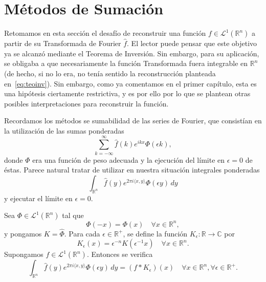 \noindent

\section{Métodos de Sumación}

Retomamos en esta sección el desafío de reconstruir una función $f \in \mathscr{L}^1(\mathbb{R}^n)$ a partir de su Transformada de Fourier $\widehat{f}$. El lector puede pensar que este objetivo ya se alcanzó mediante  el Teorema de Inversión. Sin embargo, para su aplicación, se  obligaba a que necesariamente la función Transformada fuera integrable en $\mathbb{R}^n$ (de hecho, si no lo era, no tenía sentido la reconstrucción planteada en~\eqref{eq:teoinv}). Sin embargo, como ya comentamos en el primer capítulo, esta es una hipótesis ciertamente restrictiva, y es por ello por lo que se plantean otras posibles interpretaciones para reconstruir la función.

\vspace{0.5cm}
\noindent Recordamos los métodos se sumabilidad de las series de Fourier, que consistían en la utilización de las sumas ponderadas 
\begin{equation}
    \sum_{k=-\infty}^{\infty}\widehat{f}(k)e^{ikx}\Phi(\epsilon k),
\end{equation}
donde $\Phi$ era una función de peso adecuada y la ejecución del límite en $\epsilon = 0$ de éstas.
Parece natural tratar de utilizar en nuestra situación integrales ponderadas
\begin{equation}
 \int_{\mathbb{R}^n}\widehat{f}(y)e^{2\pi i \langle x, y \rangle} \Phi(\epsilon y) \, dy 
\end{equation}
y ejecutar el límite en $\epsilon = 0$. 

\begin{proposicion} \label{ame}
    Sea $\Phi \in \mathscr{L}^1(\mathbb{R}^n)$ tal que
    \begin{equation}
        \Phi(-x) = \Phi(x) \quad \forall x \in \mathbb{R}^n,
    \end{equation}
y pongamos $K = \widehat{\Phi}$. Para cada $ \epsilon \in \mathbb{R}^+$, se define la función $K_{\epsilon}: \mathbb{R} \rightarrow \mathbb{C}$ por
\begin{equation}
    K_{\epsilon}(x) = \epsilon^{-n}K(\epsilon^{-1}x) \quad \forall x \in \mathbb{R}^n.
\end{equation}
Supongamos $f \in \mathscr{L}^1(\mathbb{R}^n)$. Entonces se verifica
\begin{equation}\label{eq:c }
     \int_{\mathbb{R}^n}\widehat{f}(y)e^{2\pi i \langle x, y \rangle} \Phi(\epsilon y) \, dy  = (f*K_{\epsilon})(x) \quad \forall x \in \mathbb{R}^n, \forall \epsilon \in \mathbb{R}^+.
\end{equation}
\end{proposicion}

